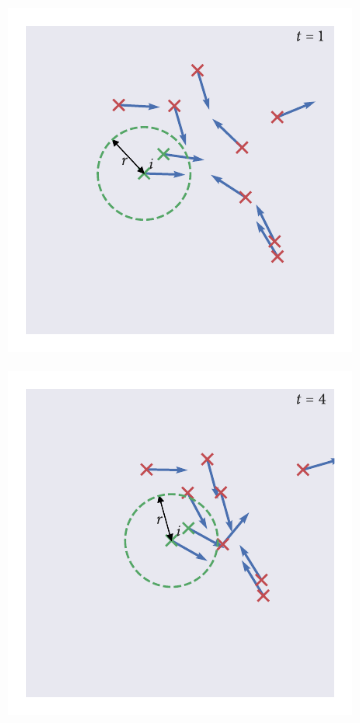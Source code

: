 \begin{figure}[tb]
  \begin{subfigure}[b]{0.5\textwidth}
    \includegraphics{vicsek_simulation_1.pdf}
  \end{subfigure}%
  \begin{subfigure}[b]{0.5\textwidth}
    \includegraphics{vicsek_simulation_4.pdf}
  \end{subfigure}
  \begin{subfigure}[b]{0.5\textwidth}

\end{subfigure}
\end{figure}
